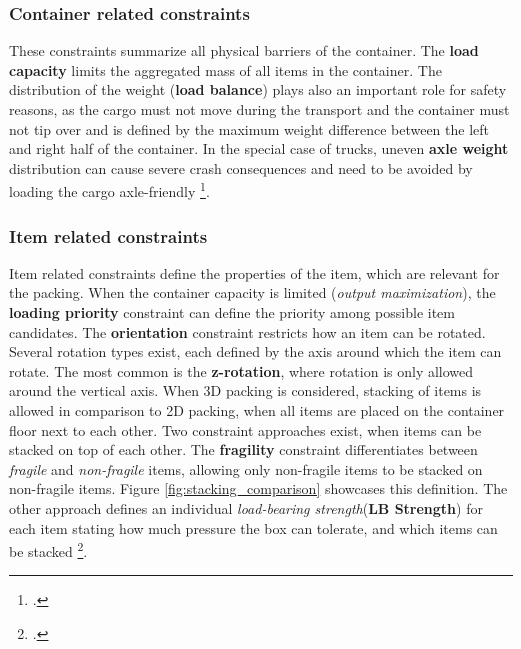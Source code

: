 \subsubsection{Container related constraints}
These constraints summarize all physical barriers of the container. The \textbf{load capacity} limits the aggregated
mass of all items in the container. The distribution of the weight (\textbf{load balance})
plays also an important role for safety reasons, as the cargo must not move during the transport and the container
must not tip over and is defined by the maximum weight difference between the left and right half of the container.
In the special case of trucks, uneven \textbf{axle weight} distribution can cause severe
crash consequences and need to be avoided by loading the cargo axle-friendly \footcite[cf.][pp. 849--850]{krebs_advanced_2021}.

\subsubsection{Item related constraints}
Item related constraints define the properties of the item, which are relevant
for the packing. When the container capacity is limited (\textit{output maximization}),
the \textbf{loading priority} constraint can define the priority among possible
item candidates. The \textbf{orientation} constraint restricts how an item can be rotated.
Several rotation types exist, each defined by the axis around which the item can rotate.
The most common is the \textbf{z-rotation}, where rotation is only allowed around the vertical axis.
When 3D packing is considered, stacking of items is allowed in comparison to 2D packing, when all
items are placed on the container floor next to each other. Two constraint approaches exist, when items can be
stacked on top of each other. The \textbf{fragility} constraint differentiates between \textit{fragile}
and \textit{non-fragile} items, allowing only non-fragile items to be stacked on non-fragile items. Figure \ref{fig:stacking_comparison} showcases
this definition. The other approach defines an individual \textit{load-bearing strength}(\textbf{LB Strength}) for each
item stating how much pressure the box can tolerate, and which items can be stacked \footcite[cf.][pp. 847--848]{krebs_advanced_2021}.



